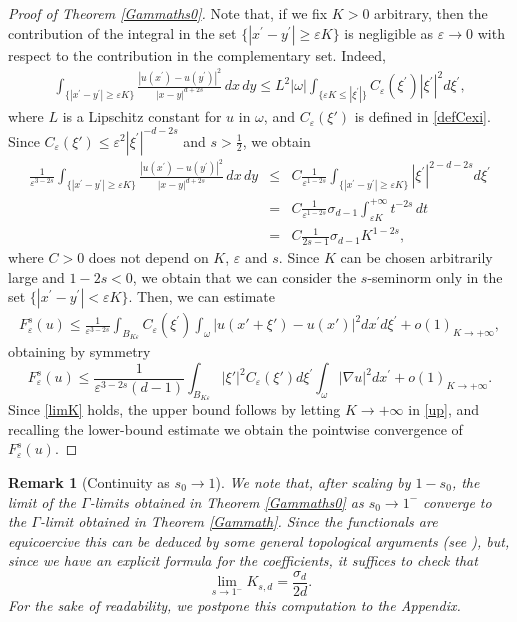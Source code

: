 \documentclass[11pt]{article}
\newtheorem{remark}[definition]{Remark}
\def\e{\varepsilon}
\begin{document}
\begin{proof}[Proof of Theorem \rm\ref{Gammaths0}]
Note that, if we fix $K>0$ arbitrary, then the contribution of the integral in the set $\{|x^\prime-y^\prime|\geq \e K\}$ is negligible as $\e\to 0$ with respect to the contribution in the complementary set. Indeed,
\begin{eqnarray*}
\int_{\{|x^\prime-y^\prime|\geq \e K\}} \frac{|u(x^\prime)-u(y^\prime)|^2}{|x-y|^{d+2s}}\, dx\, dy\leq 
L^2|\omega|\int_{\{\e K\leq |\xi^\prime|\}} C_\e(\xi^\prime)|\xi^\prime|^2 d\xi^\prime, 
\end{eqnarray*}
where $L$ is a Lipschitz constant for $u$ in $\omega$, and $C_\e(\xi')$ is defined in \eqref{defCexi}. 
Since $C_\e(\xi')\leq \e^{2}|\xi^\prime|^{-d-2s}$ and $s>\frac{1}{2}$, we obtain  
\begin{eqnarray*}
\frac{1}{\e^{3-2s}}\int_{\{|x^\prime-y^\prime|\geq \e K\}} \frac{|u(x^\prime)-u(y^\prime)|^2}{|x-y|^{d+2s}}\, dx\, dy &\leq &C\frac{1}{\e^{1-2s}}
\int_{\{|x^\prime-y^\prime|\geq \e K\}} |\xi^\prime|^{2-d-2s} d\xi^\prime\\
&=&C\frac{1}{\e^{1-2s}} \sigma_{d-1}\int_{\e K}^{+\infty} t^{-2s}\, dt\\
&=&C\frac{1}{2s-1} \sigma_{d-1}K^{1-2s}, 
\end{eqnarray*} 
where $C>0$ does not depend on $K$, $\e$ and $s$. 
Since $K$ can be chosen arbitrarily large and $1-2s<0$, we obtain that we can consider the $s$-seminorm only in the set $\{|x^\prime-y^\prime|<\e K\}$. 
Then, we can estimate
\begin{eqnarray*}
{F_\e^{s}(u)}\leq \frac{1}{\e^{3-2s}}\int_{B_{K\e}}C_\e(\xi^\prime)\int_{\omega}
|u(x'+\xi')-u(x')|^2 dx^\prime d\xi^\prime+o(1)_{K\to+\infty}, 
\end{eqnarray*}
obtaining by symmetry 
\begin{equation}\label{up}
{F_\e^{s}(u)}\leq 
\frac{1}{\e^{3-2s}(d-1)}\int_{B_{K\e}}|\xi'|^2 C_\e(\xi') d\xi^\prime \int_{\omega}
|\nabla u|^2 dx^\prime +o(1)_{K\to+\infty}.
\end{equation}
Since \eqref{limK} holds, the upper bound follows
by letting $K\to+\infty$ in \eqref{up}, and recalling the lower-bound estimate we obtain the pointwise convergence of $F_\e^s(u)$. 
\end{proof}

\begin{remark}[Continuity as $s_0\to 1$]\label{soo1}\rm
We note that, after scaling by $1-s_0$, the limit of the $\Gamma$-limits obtained in Theorem \ref{Gammaths0} as $s_0\to 1^-$ converge to the $\Gamma$-limit obtained in 
Theorem \ref{Gammath}. Since the functionals are equicoercive  this can be deduced by some general topological arguments (see \cite{DM}), but, since we have an explicit formula for the coefficients, it suffices to check that 
\begin{equation}\label{sot1}
\lim_{s\to 1^-}K_{s,d}=\frac{\sigma_d}{2d}.
\end{equation}
For the sake of readability, we postpone this computation to the Appendix.
\end{remark}
\end{document}
